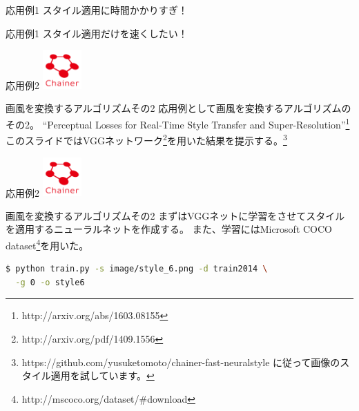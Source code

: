 \documentclass[12pt, unicode]{beamer}
\begin{document}
\begin{frame}{応用例1}
\Large{スタイル適用に時間かかりすぎ！}
\end{frame}

\begin{frame}{応用例1}
\Large{スタイル適用だけを速くしたい！}
\end{frame}

\begin{frame}{応用例2}
\includegraphics[clip,width=1.5cm]{image/chainer_logo.png}
\begin{block}{画風を変換するアルゴリズムその2}
応用例として画風を変換するアルゴリズムのその2。
``Perceptual Losses for Real-Time Style Transfer and Super-Resolution''\footnote[frame]{http://arxiv.org/abs/1603.08155}
このスライドではVGGネットワーク\footnote[frame]{http://arxiv.org/pdf/1409.1556}を用いた結果を提示する。\footnote[frame]{https://github.com/yusuketomoto/chainer-fast-neuralstyle に従って画像のスタイル適用を試しています。}
\end{block}
\end{frame}

\newcommand\Small{\fontsize{9}{9.2}\selectfont}
\begin{frame}[fragile]{応用例2}
\includegraphics[clip,width=1.5cm]{image/chainer_logo.png}
\begin{block}{画風を変換するアルゴリズムその2}
まずはVGGネットに学習をさせてスタイルを適用するニューラルネットを作成する。
また、学習にはMicrosoft COCO dataset\footnote[frame]{http://mscoco.org/dataset/\#download}を用いた。
\end{block}
\begin{lstlisting}[language=bash,basicstyle=\ttfamily\Small,caption={train with style image and dataset}]
$ python train.py -s image/style_6.png -d train2014 \
  -g 0 -o style6
\end{lstlisting}
\end{frame}
\end{document}
